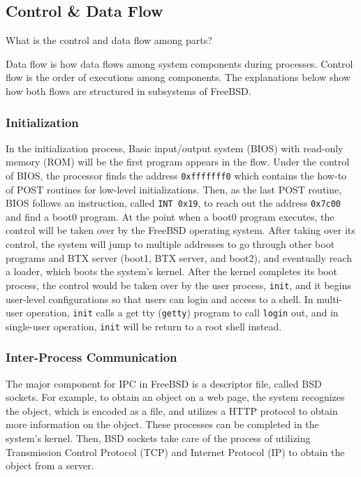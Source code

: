 \documentclass[12pt, dvipsnames, a4paper]{article}
\newcommand{\code}[1]{\texttt{#1}}
\begin{document}
\subsection{Control \& Data Flow}
What is the control and data flow among parts?\par
Data flow is how data flows among system components during processes. Control flow is the order of executions among components. The explanations below show how both flows are structured in subsystems of FreeBSD.\par
\subsubsection{Initialization}
In the initialization process, Basic input/output system (BIOS) with read-only memory (ROM) will be the first program appears in the flow. Under the control of BIOS, the processor finds the address \code{0xfffffff0} which contains the how-to of POST routines for low-level initializations. Then, as the last POST routine, BIOS follows an instruction, called \code{INT 0x19}, to reach out the address \code{0x7c00} and find a boot0 program. At the point when a boot0 program executes, the control will be taken over by the FreeBSD operating system. After taking over its control, the system will jump to multiple addresses to go through other boot programs and BTX server (boot1, BTX server, and boot2), and eventually reach a loader, which boots the system's kernel. After the kernel completes its boot process, the control would be taken over by the user process, \code{init}, and it begins user-level configurations so that users can login and access to a shell. In multi-user operation, \code{init} calls a get tty (\code{getty}) program to call \code{login} out, and in single-user operation, \code{init} will be return to a root shell instead.\par
\subsubsection{Inter-Process Communication}
The major component for IPC in FreeBSD is a descriptor file, called BSD sockets. For example, to obtain an object on a web page, the system recognizes the object, which is encoded as a file, and utilizes a HTTP protocol to obtain more information on the object. These processes can be completed in the system's kernel. Then, BSD sockets take care of the process of utilizing Transmission Control Protocol (TCP) and Internet Protocol (IP) to obtain the object from a server.\par
\end{document}
